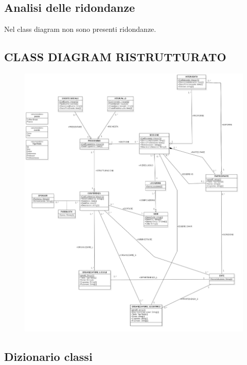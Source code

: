 \documentclass[a4page]{article}
\begin{document}
\subsection{Analisi delle ridondanze}
Nel class diagram non sono presenti ridondanze.
\newpage
\subsection{CLASS DIAGRAM RISTRUTTURATO}
\vspace{2cm}
\begin{figure}[h!]
\centering
\includegraphics[width=16.5cm]{CSR}
\end{figure}
\newpage
\subsection{Dizionario classi}
\end{document}
